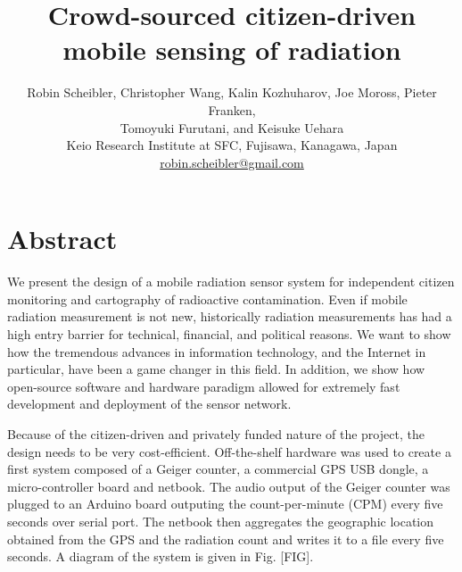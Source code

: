 \documentclass[11pt]{article}
\newcommand*{\TitleFont}{%
  \Large\usefont{T1}{phv}{b}{n}%
    \selectfont}
\newcommand*{\AuthorFont}{%
  \normalsize\usefont{T1}{\rmdefault}{m}{n}%
    \selectfont}
\begin{document}
%
\title{\TitleFont Crowd-sourced citizen-driven mobile sensing of radiation}



\author{
  \AuthorFont Robin Scheibler, Christopher Wang, Kalin Kozhuharov, Joe Moross, Pieter Franken, \\
  \AuthorFont Tomoyuki Furutani, and Keisuke Uehara \\
  \AuthorFont Keio Research Institute at SFC, Fujisawa, Kanagawa, Japan \\
  \AuthorFont \url{robin.scheibler@gmail.com}
}

\date{}

\maketitle

\thispagestyle{empty}
\pagestyle{empty}

\section*{Abstract}
\label{sec:abstract}

We present the design of a mobile radiation sensor system for independent
citizen monitoring and cartography of radioactive contamination.  Even if
mobile radiation measurement is not new, historically radiation measurements
has had a high entry barrier for technical, financial, and political reasons.
We want to show how the tremendous advances in information technology, and the
Internet in particular, have been a game changer in this field. In addition, we
show how open-source software and hardware paradigm allowed for extremely fast
development and deployment of the sensor network.

Because of the citizen-driven and privately funded nature of the project, the
design needs to be very cost-efficient. Off-the-shelf hardware was used to
create a first system composed of a Geiger counter, a commercial GPS USB
dongle, a micro-controller board and netbook. The audio output of the Geiger
counter was plugged to an Arduino board outputing the count-per-minute (CPM)
every five seconds over serial port. The netbook then aggregates the geographic
location obtained from the GPS and the radiation count and writes it to a file
every five seconds. A diagram of the system is given in Fig. [FIG].
\end{document}
